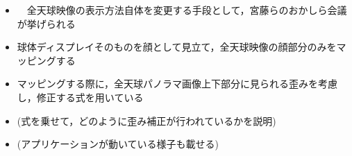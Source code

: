 \begin{itemize}
  \item　全天球映像の表示方法自体を変更する手段として，宮藤ら\cite{10}のおかしら会議が挙げられる
  \item 球体ディスプレイそのものを顔として見立て，全天球映像の顔部分のみをマッピングする
  \item マッピングする際に，全天球パノラマ画像上下部分に見られる歪みを考慮し，修正する式を用いている
  \item (式を乗せて，どのように歪み補正が行われているかを説明)
  \item (アプリケーションが動いている様子も載せる)
\end{itemize}